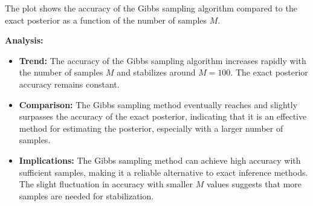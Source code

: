 \documentclass[a4 paper]{article}
\begin{document}
\begin{enumerate}
    The plot shows the accuracy of the Gibbs sampling algorithm compared to the exact posterior as a function of the number of samples $M$.

    \textbf{Analysis:}
    \begin{itemize}
        \item \textbf{Trend:} The accuracy of the Gibbs sampling algorithm increases rapidly with the number of samples $M$ and stabilizes around $M = 100$. The exact posterior accuracy remains constant.
        \item \textbf{Comparison:} The Gibbs sampling method eventually reaches and slightly surpasses the accuracy of the exact posterior, indicating that it is an effective method for estimating the posterior, especially with a larger number of samples.
        \item \textbf{Implications:} The Gibbs sampling method can achieve high accuracy with sufficient samples, making it a reliable alternative to exact inference methods. The slight fluctuation in accuracy with smaller $M$ values suggests that more samples are needed for stabilization.
    \end{itemize}

\end{enumerate}
\end{document}
